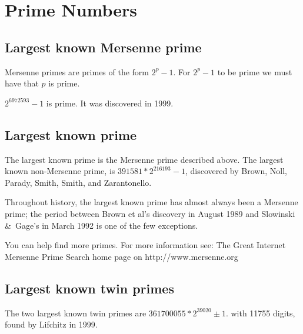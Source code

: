 \section{Prime Numbers}
    
\subsection{Largest known Mersenne prime}

 Mersenne primes are primes of the form $2^p-1$. For $2^p-1$ to be prime
    we must have that $p$ is prime. 


 $2^{6972593}-1$ is prime. It was discovered in 1999.

	
\subsection{Largest known prime}

The largest known prime is the Mersenne prime described above.
    The largest known non-Mersenne prime, is $391581*2^{216193}-1$,
    discovered by Brown, Noll, Parady, Smith, Smith, and Zarantonello. 

   Throughout history, the largest known prime has almost always been
    a Mersenne prime; the period between Brown et al's discovery in 
    August 1989 and Slowinski \&\ Gage's in March 1992 is one of the few 
    exceptions.

You can help find more primes. For more information see:
The Great Internet Mersenne Prime Search home page
on http://www.mersenne.org 

\Ref

	
\subsection{Largest known twin primes}


The two largest known twin primes are $361700055 * 2^39020 \pm 1$.
with 11755 digits, found by Lifchitz in 1999.
	
